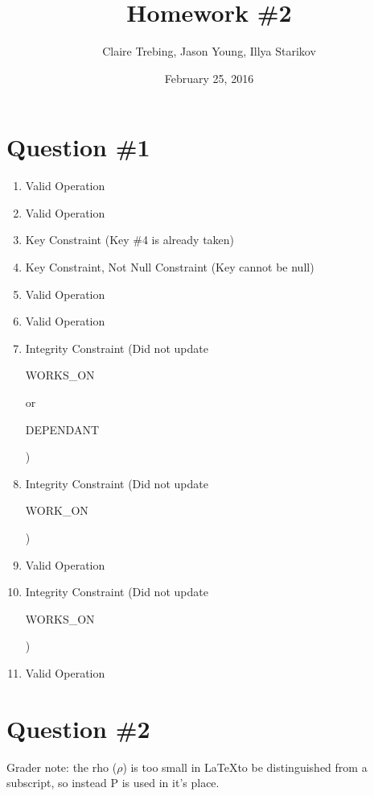\documentclass{article}
\title{Homework \#2}
\author{Claire Trebing, Jason Young, Illya Starikov}
\date{February 25, 2016}
\newcommand{\Rho}{\mathrm{P}}
\begin{document}
\maketitle

\section*{Question \#1}
\begin{enumerate}[label=\alph*.]
    \item Valid Operation
    \item Valid Operation
    \item Key Constraint (Key \#4 is already taken)
    \item Key Constraint, Not Null Constraint (Key cannot be null)
    \item Valid Operation
    \item Valid Operation
    \item Integrity Constraint (Did not update \begin{verb} WORKS_ON \end{verb} or \begin{verb} DEPENDANT \end{verb})
    \item Integrity Constraint (Did not update
    \begin{verb} WORK_ON \end{verb})
    \item Valid Operation
    \item Integrity Constraint (Did not update \begin{verb} WORKS_ON \end{verb})
    \item Valid Operation
\end{enumerate}

\section*{Question \#2}
Grader note: the rho ($\rho$) is too small in \LaTeX to be distinguished from a subscript, so instead $\Rho$ is used in it's place.
\end{document}

